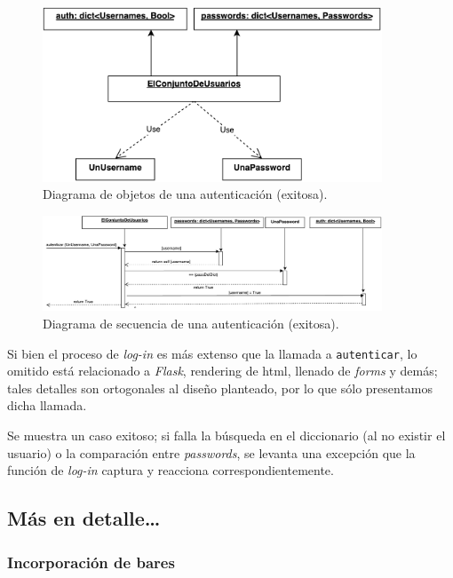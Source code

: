 \begin{figure}[ht]
    \centering
    \includegraphics[width=0.9\textwidth]{diagramas/ObjetosLogIn.pdf}
    \caption{Diagrama de objetos de una autenticación (exitosa).}\label{ObjLogIn}
\end{figure}

\begin{figure}[ht]
    \centering
    \includegraphics[width=0.9\textwidth]{diagramas/SecuenciaLogIn.pdf}
    \caption{Diagrama de secuencia de una autenticación (exitosa).}\label{SecLogIn}
\end{figure}

\par Si bien el proceso de \textit{log-in} es más extenso que la llamada a \texttt{autenticar}, lo omitido está relacionado a \textit{Flask}, rendering de html, llenado de \textit{forms} y demás; tales detalles son ortogonales al diseño planteado, por lo que sólo presentamos dicha llamada.

\par Se muestra un caso exitoso; si falla la búsqueda en el diccionario (al no existir el usuario) o la comparación entre \textit{passwords}, se levanta una excepción que la función de \textit{log-in} captura y reacciona correspondientemente.

\subsection{Más en detalle\ldots}

\subsubsection{Incorporación de bares}

